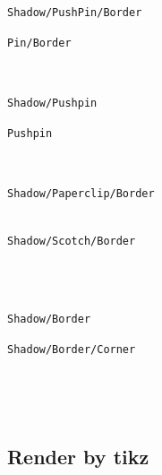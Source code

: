 \documentclass[english,a4paper,11pt]{article}
\begin{document}
\begin{DemoCode}
\hfill\begin{PostItNote}
\texttt{Shadow/PushPin/Border}
\end{PostItNote}
\begin{PostIt}[Shadow=false]
\texttt{Pin/Border}
\end{PostIt}\hfill~

\medskip

\hfill\begin{PostItNote}[Border=false]
\texttt{Shadow/Pushpin}
\end{PostItNote}
\begin{PostItNote}[Border=false,Shadow=false]
\texttt{Pushpin}
\end{PostItNote}\hfill~

\medskip

\hfill\begin{PostItNote}[Pin=Paperclip]
\texttt{Shadow/Paperclip/Border}\\
~
\end{PostItNote}
\begin{PostItNote}[Pin=Scotch]
\texttt{Shadow/Scotch/Border}\\
~
\end{PostItNote}\hfill~

\medskip

\hfill\begin{PostItNote}[Pin=None]
\texttt{Shadow/Border}
\end{PostItNote}
\begin{PostItNote}[Corner,Pin=None]
\texttt{Shadow/Border/Corner}
\end{PostItNote}\hfill~

\vspace{1cm}

\hfill\begin{PostItNote}[Title={Lipsum[1][1-4]},FontTitle={\large\sffamily},Rotate=5,Color=pink,Height=6cm,Pin=Scotch,AlignV=center,Corner]
\lipsum[1][1-4]
\end{PostItNote}\hfill~
\end{DemoCode}

\pagebreak

\subsection{Render by tikz}
\end{document}
